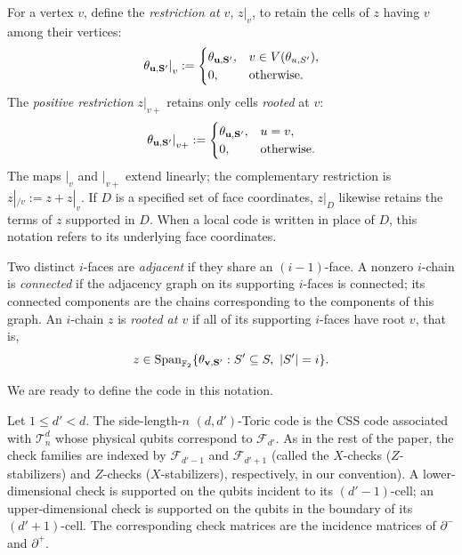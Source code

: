 \begin{definition}
For a vertex $v$, define the \emph{restriction at $v$}, $z|_v$, to retain the cells of $z$ having $v$ among their vertices:
\begin{equation*}
  \left.\mathbf{\theta_{u ,S'} }\right|_v
  :=\begin{cases}
      \mathbf{\theta_{u ,S'} },&v\in V(\theta_{u,S'}),\\
      0,&\text{otherwise}.
    \end{cases}
\end{equation*}
The \emph{positive restriction} $z|_{v+}$ retains only cells \emph{rooted} at $v$:
\begin{equation*}
  \left.\mathbf{\theta_{u ,S'} }\right|_{v+}
  :=\begin{cases}
      \mathbf{\theta_{u ,S'} },&u=v,\\
      0,&\text{otherwise}.
    \end{cases}
\end{equation*}
The maps $|_v$ and $|_{v+}$ extend linearly; the complementary restriction is $z|_{/v}:=z+z|_v$. If $D$ is a specified set of face coordinates, $z|_D$ likewise retains the terms of $z$ supported in $D$. When a local code is written in place of $D$, this notation refers to its underlying face coordinates.

Two distinct $i$-faces are \emph{adjacent} if they share an $(i-1)$-face. A nonzero $i$-chain is \emph{connected} if the adjacency graph on its supporting $i$-faces is connected; its connected components are the chains corresponding to the components of this graph. An $i$-chain $z$ is \emph{rooted at $v$} if all of its supporting $i$-faces have root $v$, that is,
\begin{equation*}
  z\in\operatorname{Span}_{\mathbb F_2}
       \{\mathbf{\theta_{v ,S'} }:S'\subseteq S,\ |S'|=i\}.
\end{equation*}
\end{definition}

We are ready to define the code in this notation.

\begin{definition}
  Let $1\le d' < d$. The side-length-$n$ $(d,d')$-Toric code is the CSS code associated with $\mathcal T_n^d$ whose physical qubits correspond to $\mathcal F_{d'}$. As in the rest of the paper, the check families are indexed by $\mathcal F_{d'-1}$ and $\mathcal F_{d'+1}$ (called the $X$-checks ($Z$-stabilizers) and $Z$-checks ($X$-stabilizers), respectively, in our convention). A lower-dimensional check is supported on the qubits incident to its $(d'-1)$-cell; an upper-dimensional check is supported on the qubits in the boundary of its $(d'+1)$-cell. The corresponding check matrices are the incidence matrices of $\partial^-$ and $\partial^+$.
\end{definition}

